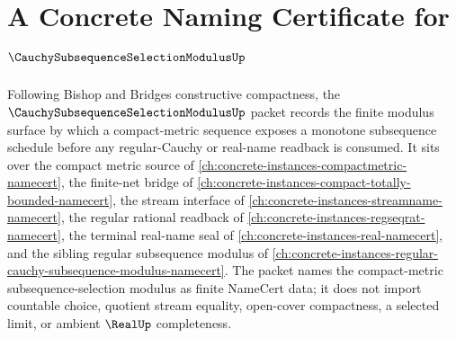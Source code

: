 \chapter{A Concrete Naming Certificate for $\CauchySubsequenceSelectionModulusUp$}
\label{ch:concrete-instances-cauchy-subsequence-selection-modulus-namecert}

Following Bishop and Bridges constructive compactness, the $\CauchySubsequenceSelectionModulusUp$ packet records the finite modulus surface by which a compact-metric sequence exposes a monotone subsequence schedule before any regular-Cauchy or real-name readback is consumed. It sits over the compact metric source of \autoref{ch:concrete-instances-compactmetric-namecert}, the finite-net bridge of \autoref{ch:concrete-instances-compact-totally-bounded-namecert}, the stream interface of \autoref{ch:concrete-instances-streamname-namecert}, the regular rational readback of \autoref{ch:concrete-instances-regseqrat-namecert}, the terminal real-name seal of \autoref{ch:concrete-instances-real-namecert}, and the sibling regular subsequence modulus of \autoref{ch:concrete-instances-regular-cauchy-subsequence-modulus-namecert}. The packet names the compact-metric subsequence-selection modulus as finite NameCert data; it does not import countable choice, quotient stream equality, open-cover compactness, a selected limit, or ambient $\RealUp$ completeness.

